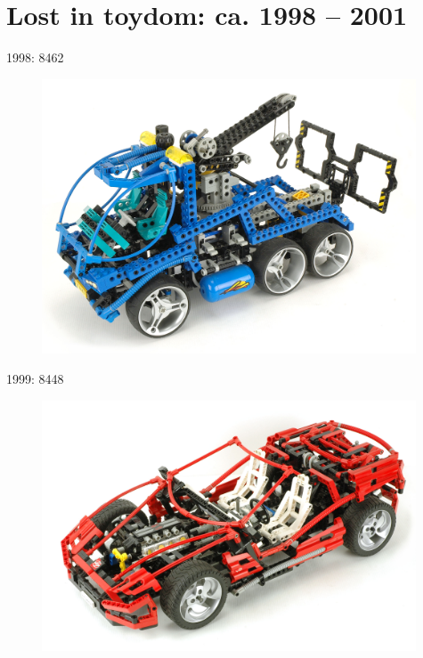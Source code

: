 \documentclass[xcolor=dvipsnames]{beamer}
\begin{document}
\section{Lost in toydom: ca. 1998 -- 2001}

\begin{frame}[fragile]{1998: 8462}
\begin{figure}[H]
 \centering
 \includegraphics[width=0.99\textwidth]{1998_8462_truck.jpg}
\end{figure}
\end{frame}

\begin{frame}[fragile]{1999: 8448}
\begin{figure}[H]
 \centering
 \includegraphics[width=0.99\textwidth]{1999_8448_car.jpg}
\end{figure}
\end{frame}
\end{document}
